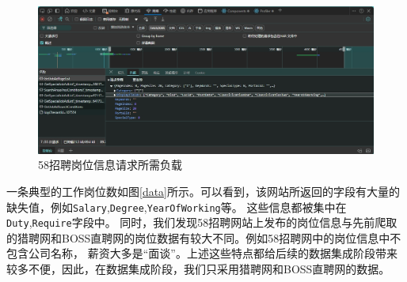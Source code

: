\begin{figure}[!htbp]
    \centering
    \includegraphics[width=\textwidth]{figures/58payload.png}
    \caption{58招聘岗位信息请求所需负载}\label{58payload}
\end{figure}

一条典型的工作岗位数如图\ref{data}所示。可以看到，该网站所返回的字段有大量的缺失值，例如\texttt{Salary},\texttt{Degree},\texttt{YearOfWorking}等。
这些信息都被集中在\texttt{Duty},\texttt{Require}字段中。
同时，我们发现58招聘网站上发布的岗位信息与先前爬取的猎聘网和BOSS直聘网的岗位数据有较大不同。例如58招聘网中的岗位信息中不包含公司名称，
薪资大多是“面谈”。上述这些特点都给后续的数据集成阶段带来较多不便，因此，在数据集成阶段，我们只采用猎聘网和BOSS直聘网的数据。

